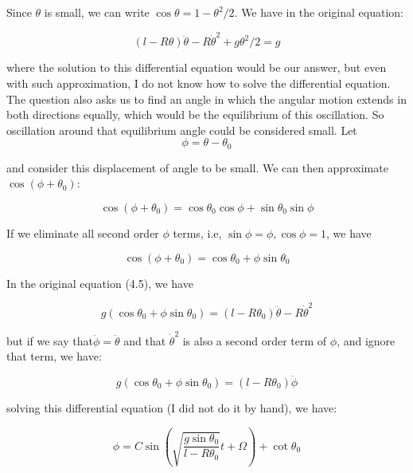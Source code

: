 \documentclass{article}
\numberwithin{equation}{section}
\begin{document}
Since $\theta$ is small, we can write $\cos \theta = 1 - \theta^2 / 2$. We have in the original equation:

\begin{equation}
    (l-R \theta) \ddot{\theta} - R \dot{\theta}^2 + g\theta^2 / 2 = g
\end{equation}

where the solution to this differential equation would be our answer, but even with such approximation, I do not know how to solve the differential equation. The question also asks us to find an angle in which the angular motion extends in both directions equally, which would be the equilibrium of this oscillation. So oscillation around that equilibrium angle could be considered small. Let \begin{equation}
    \phi = \theta - \theta_0
\end{equation}

and consider this displacement of angle to be small. We can then approximate $\cos (\phi + \theta_0)$:

\begin{equation}
    \cos(\phi+\theta_0) = \cos \theta_0 \cos \phi + \sin \theta_0 \sin \phi
\end{equation}

If we eliminate all second order $\phi$ terms, i.e, $\sin \phi = \phi, \cos \phi = 1$, we have

\begin{equation}
    \cos(\phi + \theta_0) = \cos \theta_0 + \phi \sin \theta_0
\end{equation}

In the original equation (4.5), we have

\begin{equation}
    g(\cos\theta_0 + \phi \sin \theta_0) = (l-R\theta_0) \ddot{\theta} - R\dot{\theta}^2
\end{equation}

but if we say that$\ddot{\phi} = \ddot{\theta}$ and that $\dot{\theta}^2$ is also a second order term of $\phi$, and ignore that term, we have:

\begin{equation}
    g(\cos \theta_0 + \phi \sin \theta_0) = (l - R \theta_0) \ddot{\phi}
\end{equation}

solving this differential equation (I did not do it by hand), we have:

\begin{equation}
    \phi = C \sin(\sqrt{\frac{g \sin \theta_0}{l-R \theta_0}}t + \Omega) + \cot \theta_0
\end{equation}
\end{document}
